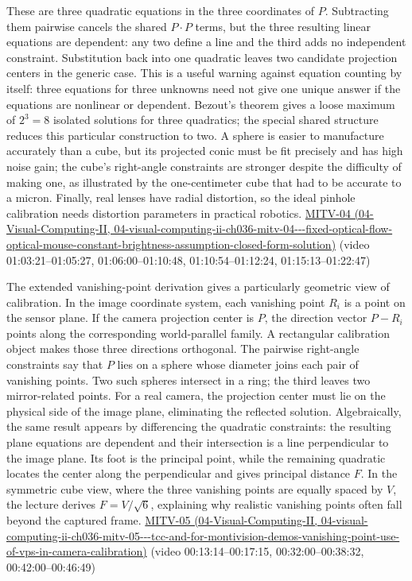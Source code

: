 These are three quadratic equations in the three coordinates of \(P\). Subtracting them pairwise cancels the shared \(P\cdot P\) terms, but the three resulting linear equations are dependent: any two define a line and the third adds no independent constraint. Substitution back into one quadratic leaves two candidate projection centers in the generic case. This is a useful warning against equation counting by itself: three equations for three unknowns need not give one unique answer if the equations are nonlinear or dependent. Bezout's theorem gives a loose maximum of \(2^3=8\) isolated solutions for three quadratics; the special shared structure reduces this particular construction to two. A sphere is easier to manufacture accurately than a cube, but its projected conic must be fit precisely and has high noise gain; the cube's right-angle constraints are stronger despite the difficulty of making one, as illustrated by the one-centimeter cube that had to be accurate to a micron. Finally, real lenses have radial distortion, so the ideal pinhole calibration needs distortion parameters in practical robotics. \href{../04-Visual-Computing-II/main.pdf\#nameddest=04-visual-computing-ii-ch036-mitv-04---fixed-optical-flow-optical-mouse-constant-brightness-assumption-closed-form-solution}{MITV-04 (04-Visual-Computing-II, 04-visual-computing-ii-ch036-mitv-04-\/-\/-fixed-optical-flow-optical-mouse-constant-brightness-assumption-closed-form-solution)} (video 01:03:21--01:05:27, 01:06:00--01:10:48, 01:10:54--01:12:24, 01:15:13--01:22:47)

The extended vanishing-point derivation gives a particularly geometric view of calibration. In the image coordinate system, each vanishing point \(R_i\) is a point on the sensor plane. If the camera projection center is \(P\), the direction vector \(P-R_i\) points along the corresponding world-parallel family. A rectangular calibration object makes those three directions orthogonal. The pairwise right-angle constraints say that \(P\) lies on a sphere whose diameter joins each pair of vanishing points. Two such spheres intersect in a ring; the third leaves two mirror-related points. For a real camera, the projection center must lie on the physical side of the image plane, eliminating the reflected solution. Algebraically, the same result appears by differencing the quadratic constraints: the resulting plane equations are dependent and their intersection is a line perpendicular to the image plane. Its foot is the principal point, while the remaining quadratic locates the center along the perpendicular and gives principal distance \(F\). In the symmetric cube view, where the three vanishing points are equally spaced by \(V\), the lecture derives \(F=V/\sqrt{6}\), explaining why realistic vanishing points often fall beyond the captured frame. \href{../04-Visual-Computing-II/main.pdf\#nameddest=04-visual-computing-ii-ch036-mitv-05---tcc-and-for-montivision-demos-vanishing-point-use-of-vps-in-camera-calibration}{MITV-05 (04-Visual-Computing-II, 04-visual-computing-ii-ch036-mitv-05-\/-\/-tcc-and-for-montivision-demos-vanishing-point-use-of-vps-in-camera-calibration)} (video 00:13:14--00:17:15, 00:32:00--00:38:32, 00:42:00--00:46:49)

